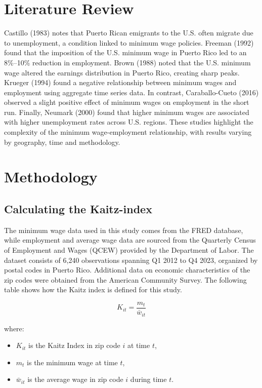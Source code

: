 \documentclass[12pt]{article}
\begin{document}
\section{Literature Review}

Castillo (1983) \cite{castillo1983jobless} notes that Puerto Rican emigrants to the U.S. often migrate due to unemployment, a condition linked to minimum
wage policies. Freeman (1992) \cite{castillo1992minimum} found that the imposition of the U.S. minimum wage in Puerto Rico led to an 8\%–10\% reduction
in employment. Brown (1988) \cite{brown1988minimum} noted that the U.S. minimum wage altered the earnings distribution in Puerto Rico, creating sharp
peaks. Krueger (1994) \cite{card1994comment} found a negative relationship between minimum wages and employment using aggregate time series data.
In contrast, Caraballo-Cueto (2016) \cite{caraballo2016there} observed a slight positive effect of minimum wages on employment in the short run.
Finally, Neumark (2000) \cite{neumark2000minimum} found that higher minimum wages are associated with higher unemployment rates across U.S. regions.
These studies highlight the complexity of the minimum wage-employment relationship, with results varying by geography, time
and methodology.


\section{Methodology}

\subsection{Calculating the Kaitz-index}

The minimum wage data used in this study comes from the FRED database, while employment and average wage data are sourced from the Quarterly
Census of Employment and Wages (QCEW) provided by the Department of Labor. The dataset consists of 6,240 observations spanning Q1 2012 to Q4 2023,
organized by postal codes in Puerto Rico. Additional data on economic characteristics of the zip codes were obtained from the American Community Survey.
The following table shows how the Kaitz index is defined for this study.


\[
	K_{it} = \frac{m_t}{\bar{w}_{it}}
\]

where:
\begin{itemize}
	\item $K_{it}$ is the Kaitz Index in zip code $i$ at time $t$,
	\item $m_t$ is the minimum wage at time $t$,
	\item $\bar{w}_{it}$ is the average wage in zip code $i$ during time $t$.
\end{itemize}
\end{document}
